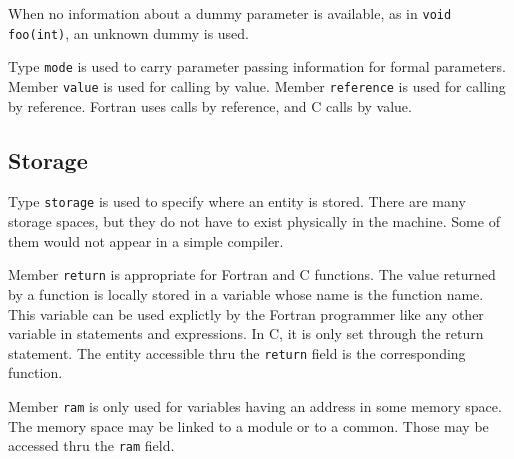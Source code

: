 \documentclass[a4paper]{article}
\begin{document}
When no information about a dummy parameter is available, as in
\verb/void foo(int)/, an unknown dummy is used.



Type \texttt{mode} is used to carry parameter passing information for formal
parameters. Member \texttt{value} is used for calling by value. Member
\texttt{reference} is used for calling by reference. Fortran uses
calls by reference, and C calls by value.

\subsection{Storage}
\label{subsection-storage}

{}

Type \texttt{storage} is used to specify where an entity is stored. There
are many storage spaces, but they do not have to exist physically in the
machine. Some of them would not appear in a simple compiler.

\begin{comment}
Le domaine \verb/storage/ permet de pr�ciser dans quelle zone de la
m�moire est stock�e une entit�. Il y a plusieurs zones, qui ne
correspondent pas n�cessairement � la r�alit�, c'est-�-dire aux
zones de m�moire qui seraient affect�es par un compilateur.
\end{comment}

Member \texttt{return} is appropriate for Fortran and C functions. The
value returned by a function is locally stored in a variable whose
name is the function name. This variable can be used explictly by the
Fortran programmer like any other variable in statements and
expressions. In C, it is only set through the return statement. The
entity accessible thru the \texttt{return} field is the corresponding
function.

\begin{comment}
Le sous-domaine \verb/return/ permet de repr�senter les variables ayant
pour nom le nom d'une fonction et auxquelles on affecte la valeur que la
fonction doit retourner. L'entit� point�e par \verb/return/ est la
fonction concern�e.
\end{comment}

Member \texttt{ram} is only used for variables having an address in
some memory space. The memory space may be linked to a module or to a
common. Those may be accessed thru the \texttt{ram} field.
\end{document}
